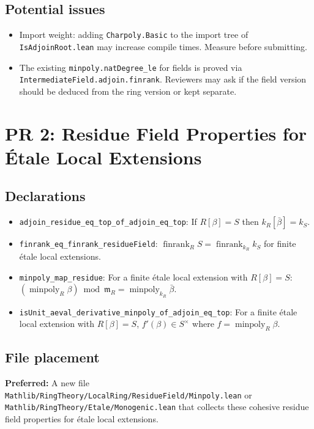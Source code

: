 \subsection*{Potential issues}
\begin{itemize}
  \item Import weight: adding \texttt{Charpoly.Basic} to the import tree of
    \texttt{IsAdjoinRoot.lean} may increase compile times. Measure before submitting.
  \item The existing \texttt{minpoly.natDegree\_le} for fields is proved via
    \texttt{IntermediateField.adjoin.finrank}. Reviewers may ask if the
    field version should be deduced from the ring version or kept separate.
\end{itemize}


\section{PR 2: Residue Field Properties for \'Etale Local Extensions}
\label{sec:pr2}

\subsection*{Declarations}

\begin{itemize}
  \item \texttt{adjoin\_residue\_eq\_top\_of\_adjoin\_eq\_top}:
    If $R[\beta] = S$ then $k_R[\bar\beta] = k_S$.
  \item \texttt{finrank\_eq\_finrank\_residueField}:
    $\operatorname{finrank}_R S = \operatorname{finrank}_{k_R} k_S$
    for finite étale local extensions.
  \item \texttt{minpoly\_map\_residue}: For a finite étale local extension
    with $R[\beta] = S$:
    $(\operatorname{minpoly}_R \beta) \bmod \mathfrak{m}_R
    = \operatorname{minpoly}_{k_R} \bar\beta$.
  \item \texttt{isUnit\_aeval\_derivative\_minpoly\_of\_adjoin\_eq\_top}:
    For a finite étale local extension with $R[\beta] = S$,
    $f'(\beta) \in S^\times$ where $f = \operatorname{minpoly}_R \beta$.
\end{itemize}

\subsection*{File placement}

\textbf{Preferred:} A new file \texttt{Mathlib/RingTheory/LocalRing/ResidueField/Minpoly.lean} or \texttt{Mathlib/RingTheory/Etale/Monogenic.lean} that collects these cohesive residue field properties for étale local extensions.

